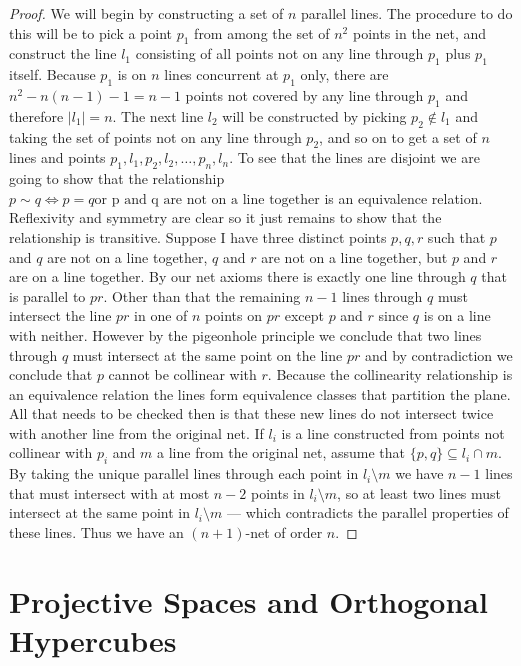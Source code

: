 \documentclass{article}
\begin{document}
\begin{proof}
  We will begin by constructing a set of \(n\) parallel lines.
  The procedure to do this will be to pick a point \(p_{1}\) from among the set of \(n^{2}\) points in the net, and construct the line \(l_{1}\) consisting of all points not on any line through \(p_{1}\) plus \(p_{1}\) itself. Because \(p_{1}\) is on \(n\) lines concurrent at \(p_{1}\) only, there are \(n^{2} - n(n - 1) - 1 = n - 1\) points not covered by any line through \(p_{1}\) and therefore \(|l_{1}| = n\). The next line \(l_{2}\) will be constructed by picking \(p_{2} \notin l_{1}\) and taking the set of points not on any line through \(p_{2}\), and so on to get a set of \(n\) lines and points \(p_{1}, l_{1}, p_{2}, l_{2}, \ldots, p_{n}, l_{n}\). To see that the lines are disjoint we are going to show that the relationship \(p \sim q \iff p = q \text{or p and q are not on a line together}\) is an equivalence relation. Reflexivity and symmetry are clear so it just remains to show that the relationship is transitive. Suppose I have three distinct points \(p, q, r\) such that \(p\) and \(q\) are not on a line together, \(q\) and \(r\) are not on a line together, but \(p\) and \(r\) are on a line together.
  By our net axioms there is exactly one line through \(q\) that is parallel to \(pr\). Other than that the remaining \(n - 1\) lines through \(q\) must intersect the line \(pr\) in one of \(n\) points on \(pr\) except \(p\) and \(r\) since \(q\) is on a line with neither. However by the pigeonhole principle we conclude that two lines through \(q\) must intersect at the same point on the line \(pr\) and by contradiction we conclude that \(p\) cannot be collinear with \(r\). Because the collinearity relationship is an equivalence relation the lines form equivalence classes that partition the plane. All that needs to be checked then is that these new lines do not intersect twice with another line from the original net. If \(l_{i}\) is a line constructed from points not collinear with \(p_{i}\) and \(m\) a line from the original net, assume that \(\{p, q\} \subseteq l_{i} \cap m\). By taking the unique parallel lines through each point in \(l_{i} \setminus m\) we have \(n - 1\) lines that must intersect with at most \(n - 2\) points in \(l_{i} \setminus m\), so at least two lines must intersect at the same point in \(l_{i} \setminus m\) --- which contradicts the parallel properties of these lines. Thus we have an \((n + 1)\)-net of order \(n\).
\end{proof}
\section{Projective Spaces and Orthogonal Hypercubes}
\end{document}
